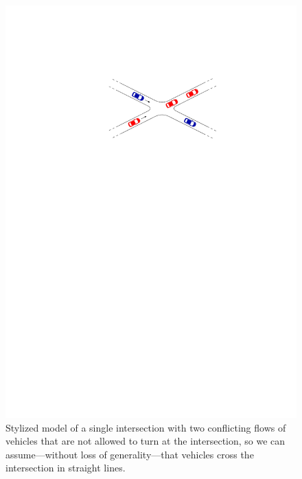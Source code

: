 \documentclass[a4paper]{report}
\theoremstyle{definition}
\theoremstyle{plain}
\begin{document}
\begin{figure}
  \centering
  \includegraphics[scale=1]{figures/intersection-nice}
  \caption{Stylized model of a single intersection with two conflicting flows of
    vehicles that are not allowed to turn at the intersection, so we can
    assume---without loss of generality---that vehicles cross the
    intersection in straight lines.}\label{fig:intersection-nice}
\end{figure}
\end{document}
